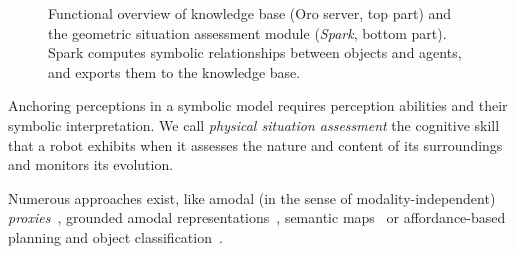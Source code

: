 \documentclass[preprint,3p,times]{elsarticle}
\begin{document}
\begin{figure}
{
}
    \caption{Functional overview of knowledge base ({\sc Oro} server, top part)
    and the geometric situation assessment module (\emph{{\sc Spark}}, bottom
    part). {\sc Spark} computes symbolic relationships between objects and
    agents, and exports them to the knowledge base.}

        \label{fig|spark-oro}
\end{figure}

Anchoring perceptions in a symbolic model requires perception abilities and
their symbolic interpretation. We call \emph{physical situation assessment} the
cognitive skill that a robot exhibits when it assesses the nature and content of its
surroundings and monitors its evolution.

Numerous approaches exist, like amodal (in the sense of modality-independent)
\emph{proxies}~\cite{Jacobsson2008}, grounded amodal
representations~\cite{Mavridis2006}, semantic
maps~\cite{Nuechter2008, Galindo2008,Blodow2011} or affordance-based planning
and object classification~\cite{Lorken2008, Varadarajan2011}.

\end{document}
